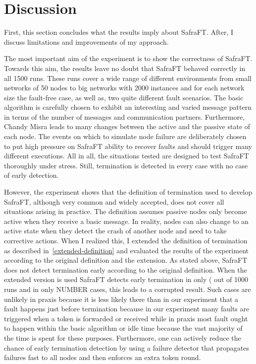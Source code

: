 \section{Discussion}
First, this section concludes what the results imply about SafraFT. After, I discuss limitations and improvements of my approach.

The most important aim of the experiment is to show the correctness of SafraFT.
Towards this aim, the results leave no doubt that SafraFT behaved correctly in all 1500 %
runs.
These runs cover a wide range of different environments from small networks of 50 nodes to big networks with 2000 instances and for each network size the fault-free case, as well as, two quite different fault scenarios.
The basic algorithm is carefully chosen to exhibit an interesting and varied message pattern in terms of the number of messages and communication partners.
Furthermore, Chandy Misra leads to many changes between the active and the passive state of each node.
The events on which to simulate node failure are deliberately chosen to put high pressure on SafraFT ability to recover faults and should trigger many different executions.
All in all, the situations tested are designed to test SafraFT thoroughly under stress.
Still, termination is detected in every case with no case of early detection.

However, the experiment shows that the definition of termination used to develop SafraFT, although very common and widely accepted, does not cover all situations arising in practice.
The definition assumes passive nodes only become active when they receive a basic message.
In reality, nodes can also change to an active state when they detect the crash of another node and need to take corrective actions.
When I realized this, I extended the definition of termination as described in~\cref{extended-definition} and evaluated the results of the experiment according to the original definition and the extension.
As stated above, SafraFT does not detect termination early according to the original definition.
When the extended version is used SafraFT detects early termination in only ( out of 1000 runs and in only NUMBER cases, this leads to a corrupted result. %
Such cases are unlikely in praxis because it is less likely there than in our experiment that a fault happens just before termination because in our experiment many faults are triggered when a token is forwarded or received while in praxis most fault ought to happen within the basic algorithm or idle time because the vast majority of the time is spent for these purposes.
Furthermore, one can actively reduce the chance of early termination detection by using a failure detector that propagates failures fast to all nodes and then enforces an extra token round.



